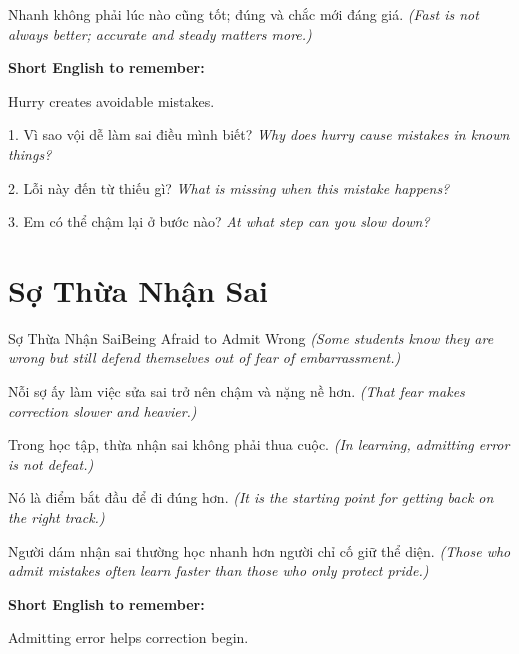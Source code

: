 \begin{baihoc}
Nhanh không phải lúc nào cũng tốt; đúng và chắc mới đáng giá.
\textit{(Fast is not always better; accurate and steady matters more.)}
\end{baihoc}

\begin{ghinhoanh}
\textbf{Short English to remember:}

Hurry creates avoidable mistakes.

\end{ghinhoanh}

\begin{tuhocnhanh}
1. Vì sao vội dễ làm sai điều mình biết? \textit{Why does hurry cause mistakes in known things?}

2. Lỗi này đến từ thiếu gì? \textit{What is missing when this mistake happens?}

3. Em có thể chậm lại ở bước nào? \textit{At what step can you slow down?}
\end{tuhocnhanh}
\ngancach

\section{Sợ Thừa Nhận Sai}
\begin{truyen}{Sợ Thừa Nhận Sai}{Being Afraid to Admit Wrong}
\textit{(Some students know they are wrong but still defend themselves out of fear of embarrassment.)}

Nỗi sợ ấy làm việc sửa sai trở nên chậm và nặng nề hơn.
\textit{(That fear makes correction slower and heavier.)}

Trong học tập, thừa nhận sai không phải thua cuộc.
\textit{(In learning, admitting error is not defeat.)}

Nó là điểm bắt đầu để đi đúng hơn.
\textit{(It is the starting point for getting back on the right track.)}
\end{truyen}

\begin{baihoc}
Người dám nhận sai thường học nhanh hơn người chỉ cố giữ thể diện.
\textit{(Those who admit mistakes often learn faster than those who only protect pride.)}
\end{baihoc}

\begin{ghinhoanh}
\textbf{Short English to remember:}

Admitting error helps correction begin.

\end{ghinhoanh}

